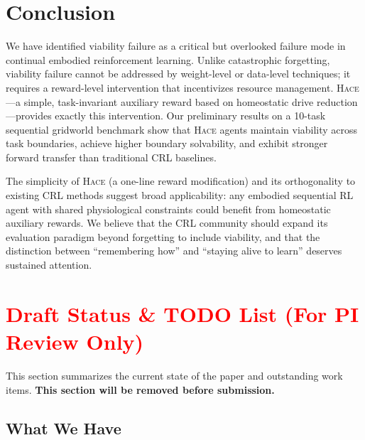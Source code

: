 \documentclass{article}
\newcommand{\hace}{\textsc{Hace}}
\begin{document}
\section{Conclusion}
\label{sec:conclusion}

We have identified viability failure as a critical but overlooked failure
mode in continual embodied reinforcement learning. Unlike catastrophic
forgetting, viability failure cannot be addressed by weight-level or
data-level techniques; it requires a reward-level intervention that
incentivizes resource management. \hace{}—a simple, task-invariant
auxiliary reward based on homeostatic drive reduction—provides exactly
this intervention. Our preliminary results on a 10-task sequential
gridworld benchmark show that \hace{} agents maintain viability across
task boundaries, achieve higher boundary solvability, and exhibit
stronger forward transfer than traditional CRL baselines.

The simplicity of \hace{} (a one-line reward modification) and its
orthogonality to existing CRL methods suggest broad applicability:
any embodied sequential RL agent with shared physiological constraints
could benefit from homeostatic auxiliary rewards. We believe that the
CRL community should expand its evaluation paradigm beyond forgetting
to include viability, and that the distinction between ``remembering
how'' and ``staying alive to learn'' deserves sustained attention.


\newpage
\appendix
\section*{\textcolor{red}{Draft Status \& TODO List (For PI Review Only)}}

This section summarizes the current state of the paper and outstanding
work items. \textbf{This section will be removed before submission.}

\subsection*{What We Have}
\end{document}

